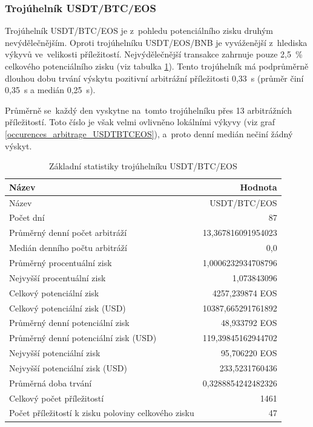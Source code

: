 \documentclass[thesis=B,czech]{FITthesis}[2019/03/21]
\begin{document}
\subsubsection{Trojúhelník USDT/BTC/EOS}
Trojúhelník USDT/BTC/EOS je z~pohledu potenciálního zisku druhým nevýdělečnějším. Oproti trojúhelníku USDT/EOS/BNB je vyváženější z~hlediska výkyvů ve~velikosti příležitostí. Nejvýdělečnější transakce zahrnuje pouze 2,5~\% celkového potenciálního zisku (viz tabulka \ref{USDTBTCEOS_stats}). Tento trojúhelník má podprůměrně dlouhou dobu trvání výskytu pozitivní arbitrážní příležitosti 0,33~s (průměr činí 0,35~s a medián 0,25~s). 

Průměrně se~každý den vyskytne na~tomto trojúhelníku přes 13 arbitrážních příležitostí. Toto číslo je však velmi ovlivněno lokálními výkyvy (viz graf \ref{occurences_arbitrage_USDTBTCEOS}), a~proto denní medián nečiní žádný výskyt.

\begin{table}\centering
\caption{Základní statistiky trojúhelníku USDT/BTC/EOS}
\label{USDTBTCEOS_stats}
\begin{tabular}{|| l | r ||}
\hline Název & Hodnota \\ 
\hline\hline Název & USDT/BTC/EOS \\ 
\hline Počet dní & 87 \\ 
\hline Průměrný denní počet arbitráží & 13,367816091954023 \\ 
\hline Medián denního počtu arbitráží & 0,0 \\ 
\hline Průměrný procentuální zisk & 1,0006232934708796 \\ 
\hline Nejvyšší procentuální zisk & 1,073843096 \\ 
\hline Celkový potenciální zisk & 4257,239874 EOS \\ 
\hline Celkový potenciální zisk (USD) & 10387,665291761892 \\ 
\hline Průměrný denní potenciální zisk & 48,933792 EOS \\ 
\hline Průměrný denní potenciální zisk (USD) & 119,39845162944702 \\ 
\hline Nejvyšší potenciální zisk & 95,706220 EOS \\ 
\hline Nejvyšší potenciální zisk (USD) & 233,5231760436 \\ 
\hline Průměrná doba trvání & 0,3288854242482326 \\ 
\hline Celkový počet příležitostí & 1461 \\ 
\hline Počet příležitostí k zisku poloviny celkového zisku & 47 \\ 
\hline
\end{tabular}
\end{table}
\end{document}
